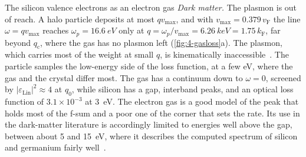 \begin{workedexample}{The silicon valence electrons as an electron gas}
\emph{Dark matter.} The plasmon is out of reach. A halo particle deposits at most $qv_{\mathrm{max}}$, and with $v_{\mathrm{max}} = 0.379\,v_{\mathrm{F}}$ the line $\omega = qv_{\mathrm{max}}$ reaches $\omega_p = \SI{16.6}{eV}$ only at $q = \omega_p/v_{\mathrm{max}} = \SI{6.26}{keV} = 1.75\,k_{\mathrm{F}}$, far beyond $q_{\mathrm{c}}$, where the gas has no plasmon left (\cref{fig:4-gasloss}a). The plasmon, which carries most of the weight at small $q$, is kinematically inaccessible~\cite{kahn2022searches}. The particle samples the low-energy side of the loss function, at a few eV, where the gas and the crystal differ most. The gas has a continuum down to $\omega = 0$, screened by $|\varepsilon_{\mathrm{Lin}}|^2 \approx 4$ at $q_0$, while silicon has a gap, interband peaks, and an optical loss function of $3.1\times10^{-3}$ at \SI{3}{eV}. The electron gas is a good model of the peak that holds most of the f-sum and a poor one of the corner that sets the rate. Its use in the dark-matter literature is accordingly limited to energies well above the gap, between about 5 and \SI{15}{eV}, where it describes the computed spectrum of silicon and germanium fairly well~\cite{kahn2022searches}.
\end{workedexample}
